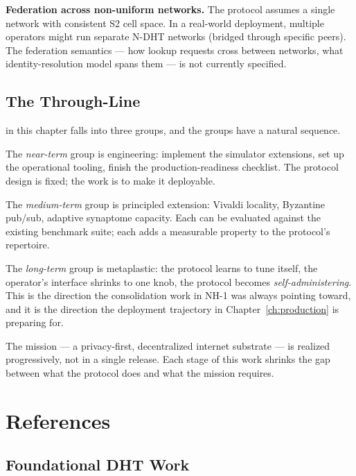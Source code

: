 \documentclass[twoside,nobib]{tufte-book}
\newcommand{\NDHT}{N-DHT\xspace}
\begin{document}
\textbf{Federation across non-uniform networks.} The protocol
assumes a single network with consistent S2 cell space. In a
real-world deployment, multiple operators might run separate
\NDHT networks (bridged through specific peers). The federation
semantics ---  how lookup requests cross between networks, what
identity-resolution model spans them --- is not currently
specified.

\section{The Through-Line}

 in this chapter falls into
three groups, and the groups have a natural sequence.

The \emph{near-term} group is engineering: implement the
simulator extensions, set up the operational tooling, finish the
production-readiness checklist. The protocol design is fixed;
the work is to make it deployable.

The \emph{medium-term} group is principled extension: Vivaldi
locality, Byzantine pub/sub, adaptive synaptome capacity. Each
can be evaluated against the existing benchmark suite; each adds
a measurable property to the protocol's repertoire.

The \emph{long-term} group is metaplastic: the protocol learns
to tune itself, the operator's interface shrinks to one knob,
the protocol becomes \emph{self-administering}. This is the
direction the consolidation work in NH-1 was always pointing
toward, and it is the direction the deployment trajectory in
Chapter~\ref{ch:production} is preparing for.

The mission --- a privacy-first, decentralized internet
substrate --- is realized progressively, not in a single
release. Each stage of this work shrinks the gap between what
the protocol does and what the mission requires.


\chapter*{References}
\label{ch:refs}

\section*{Foundational DHT Work}
\end{document}
